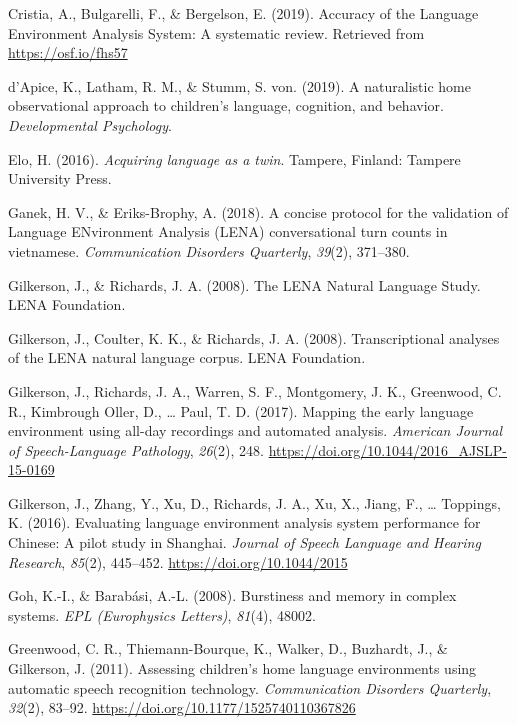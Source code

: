 \documentclass[english,table,man,floatsintext]{apa6}
\begin{document}
\hypertarget{ref-Cristia}{}
Cristia, A., Bulgarelli, F., \& Bergelson, E. (2019). Accuracy of the
Language Environment Analysis System: A systematic review. Retrieved
from \url{https://osf.io/fhs57}

\hypertarget{ref-d2019naturalistic}{}
d'Apice, K., Latham, R. M., \& Stumm, S. von. (2019). A naturalistic
home observational approach to children's language, cognition, and
behavior. \emph{Developmental Psychology}.

\hypertarget{ref-Elo}{}
Elo, H. (2016). \emph{Acquiring language as a twin}. Tampere, Finland:
Tampere University Press.

\hypertarget{ref-ganek2018concise}{}
Ganek, H. V., \& Eriks-Brophy, A. (2018). A concise protocol for the
validation of Language ENvironment Analysis (LENA) conversational turn
counts in vietnamese. \emph{Communication Disorders Quarterly},
\emph{39}(2), 371--380.

\hypertarget{ref-gilkerson2008lena}{}
Gilkerson, J., \& Richards, J. A. (2008). The LENA Natural Language
Study. LENA Foundation.

\hypertarget{ref-Gilkerson2008ltr6}{}
Gilkerson, J., Coulter, K. K., \& Richards, J. A. (2008).
Transcriptional analyses of the LENA natural language corpus. LENA
Foundation.

\hypertarget{ref-Gilkerson2017}{}
Gilkerson, J., Richards, J. A., Warren, S. F., Montgomery, J. K.,
Greenwood, C. R., Kimbrough Oller, D., \ldots{} Paul, T. D. (2017).
Mapping the early language environment using all-day recordings and
automated analysis. \emph{American Journal of Speech-Language
Pathology}, \emph{26}(2), 248.
\url{https://doi.org/10.1044/2016_AJSLP-15-0169}

\hypertarget{ref-Gilkerson2016}{}
Gilkerson, J., Zhang, Y., Xu, D., Richards, J. A., Xu, X., Jiang, F.,
\ldots{} Toppings, K. (2016). Evaluating language environment analysis
system performance for Chinese: A pilot study in Shanghai. \emph{Journal
of Speech Language and Hearing Research}, \emph{85}(2), 445--452.
\url{https://doi.org/10.1044/2015}

\hypertarget{ref-goh2008burstiness}{}
Goh, K.-I., \& Barabási, A.-L. (2008). Burstiness and memory in complex
systems. \emph{EPL (Europhysics Letters)}, \emph{81}(4), 48002.

\hypertarget{ref-Greenwood2011}{}
Greenwood, C. R., Thiemann-Bourque, K., Walker, D., Buzhardt, J., \&
Gilkerson, J. (2011). Assessing children's home language environments
using automatic speech recognition technology. \emph{Communication
Disorders Quarterly}, \emph{32}(2), 83--92.
\url{https://doi.org/10.1177/1525740110367826}
\end{document}

